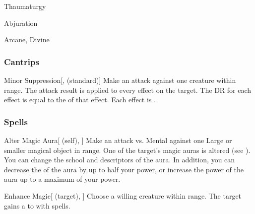 \newpage
\begin{spellsection}{Thaumaturgy}

\begin{spellheader}
\end{spellheader}


 Abjuration

 Arcane, Divine

\subsubsection{Cantrips}


\begin{freeability}{Minor Suppression}[,  (standard)]
Make an attack against one creature within \rngmed range.
The attack result is applied to every  effect on the target.
The DR for each effect is equal to the  of that effect.
\hit Each effect is .
\end{freeability}

\end{spellsection}


\subsubsection{Spells}


\lowercase{\hypertarget{spell:Alter Magic Aura}{}}\label{spell:Alter Magic Aura}
\begin{attuneability}[\nth{1}]{\hypertarget{spell:Alter Magic Aura}{Alter Magic Aura}}[ (self), ]
Make an attack vs. Mental against one Large or smaller magical object in \rngmed range.
\hit One of the target's magic auras is altered (see ).
You can change the school and descriptors of the aura.
In addition, you can decrease the  of the aura by up to half your power, or increase the power of the aura up to a maximum of your power.
\end{attuneability}
\vspace{0.25em}



\lowercase{\hypertarget{spell:Enhance Magic}{}}\label{spell:Enhance Magic}
\begin{attuneability}[\nth{1}]{\hypertarget{spell:Enhance Magic}{Enhance Magic}}[ (target), ]
Choose a willing creature within \rngmed range.
The target gains a   to  with spells.
\end{attuneability}
\vspace{0.25em}



